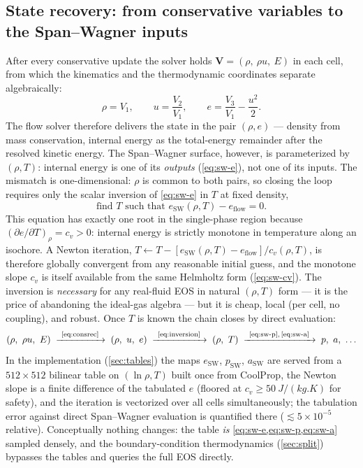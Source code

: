 \documentclass[11pt]{article}
\begin{document}
\subsection{State recovery: from conservative variables to the
Span--Wagner inputs}
\label{app:recovery}

After every conservative update the solver holds
$\mathbf{V} = (\rho,\ \rho u,\ E)$ in each cell, from which the
kinematics and the thermodynamic coordinates separate algebraically:
\begin{equation}
\rho = V_1,
\qquad
u = \frac{V_2}{V_1},
\qquad
e = \frac{V_3}{V_1} - \frac{u^{2}}{2}.
\label{eq:consrec}
\end{equation}
The flow solver therefore delivers the state in the pair
$(\rho, e)$ --- density from mass conservation, internal energy as the
total-energy remainder after the resolved kinetic energy. The
Span--Wagner surface, however, is parameterized by $(\rho, T)$:
internal energy is one of its \emph{outputs} (\cref{eq:sw-e}), not one
of its inputs. The mismatch is one-dimensional: $\rho$ is common to
both pairs, so closing the loop requires only the scalar inversion of
\cref{eq:sw-e} in $T$ at fixed density,
\begin{equation}
\text{find } T \text{ such that }
e_{\mathrm{SW}}(\rho, T) - e_{\mathrm{flow}} = 0 .
\label{eq:inversion}
\end{equation}
This equation has exactly one root in the single-phase region because
$\left(\partial e/\partial T\right)_\rho = c_v > 0$: internal energy
is strictly monotone in temperature along an isochore. A
Newton iteration,
$T \leftarrow T - \left[e_{\mathrm{SW}}(\rho,T) -
e_{\mathrm{flow}}\right] / c_v(\rho, T)$,
is therefore globally convergent from any reasonable initial guess,
and the monotone slope $c_v$ is itself available from the same
Helmholtz form (\cref{eq:sw-cv}). The inversion is \emph{necessary}
for any real-fluid EOS in natural $(\rho,T)$ form --- it is the price
of abandoning the ideal-gas algebra --- but it is cheap, local
(per cell, no coupling), and robust. Once $T$ is known the chain
closes by direct evaluation:
\begin{equation}
(\rho,\ \rho u,\ E)
\;\xrightarrow{\ \text{\cref{eq:consrec}}\ }\;
(\rho,\ u,\ e)
\;\xrightarrow{\ \text{\cref{eq:inversion}}\ }\;
(\rho,\ T)
\;\xrightarrow{\ \text{\cref{eq:sw-p},\,\cref{eq:sw-a}}\ }\;
p,\ a,\ \dots
\label{eq:chain}
\end{equation}
In the implementation (\cref{sec:tables}) the maps
$e_{\mathrm{SW}}$, $p_{\mathrm{SW}}$, $a_{\mathrm{SW}}$ are served
from a $512\times512$ bilinear table on $(\ln\rho, T)$ built once
from CoolProp, the Newton slope is a finite difference of the
tabulated $e$ (floored at $c_v \ge \SI{50}{J/(kg.K)}$ for safety),
and the iteration is vectorized over all cells simultaneously; the
tabulation error against direct Span--Wagner evaluation is quantified
there ($\lesssim 5\times10^{-5}$ relative). Conceptually nothing
changes: the table \emph{is} \cref{eq:sw-e,eq:sw-p,eq:sw-a} sampled
densely, and the boundary-condition thermodynamics
(\cref{sec:split}) bypasses the tables and queries the full EOS
directly.
\end{document}
